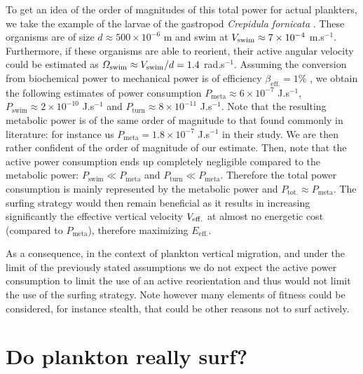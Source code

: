 To get an idea of the order of magnitudes of this total power for actual plankters, we take the example of the larvae of the gastropod \textit{Crepidula fornicata} \citep{dibenedetto2022responding}.
These organisms are of size $d \approx 500 \times 10^{-6}$ m and swim at $V_{\mathrm{swim}} \approx 7 \times 10^{-4}$ m.s$^{-1}$.
Furthermore, if these organisms are able to reorient, their active angular velocity could be estimated as $\varOmega_{\mathrm{swim}} \approx V_{\mathrm{swim}} / d = 1.4$ rad.s$^{-1}$.
Assuming the conversion from biochemical power to mechanical power is of efficiency $\beta_{\mathrm{eff.}} = 1\%$ , we obtain the following estimates of power consumption $P_{\mathrm{meta}} \approx 6 \times 10^{-7}$ J.s$^{-1}$, $P_{\mathrm{swim}} \approx 2 \times 10^{-10}$ J.s$^{-1}$ and $P_{\mathrm{turn}} \approx 8 \times 10^{-11}$ J.s$^{-1}$.
Note that the resulting metabolic power is of the same order of magnitude to that found commonly in literature: for instance \citet{visser2009swimming} us $P_{\mathrm{meta}} = 1.8 \times 10^{-7}$ J.s$^{-1}$ in their study.
We are then rather confident of the order of magnitude of our estimate.
Then, note that the active power consumption ends up completely negligible compared to the metabolic power: $P_{\mathrm{swim}} \ll P_{\mathrm{meta}}$ and $P_{\mathrm{turn}} \ll P_{\mathrm{meta}}$.
Therefore the total power consumption is mainly represented by the metabolic power and $P_{\mathrm{tot.}} \approx P_{\mathrm{meta}}$.
The surfing strategy would then remain beneficial as it results in increasing significantly the effective vertical velocity $V_{\mathrm{eff.}}$ at almost no energetic cost (compared to $P_{\mathrm{meta}}$), therefore maximizing $E_{\mathrm{eff.}}$.

As a consequence, in the context of plankton vertical migration, and under the limit of the previously stated assumptions we do not expect the active power consumption to limit the use of an active reorientation and thus would not limit the use of the surfing strategy.
Note however many elements of fitness could be considered, for instance stealth, that could be other reasons not to surf actively.







\section{Do plankton really surf?}\label{sec:do_they_surf}

